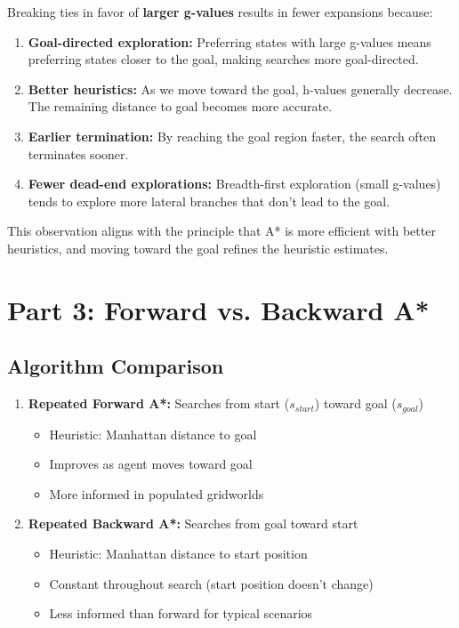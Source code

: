 \documentclass[12pt]{article}
\begin{document}
Breaking ties in favor of \textbf{larger g-values} results in fewer expansions because:

\begin{enumerate}
    \item \textbf{Goal-directed exploration:} Preferring states with large g-values means 
    preferring states closer to the goal, making searches more goal-directed.
    
    \item \textbf{Better heuristics:} As we move toward the goal, h-values generally decrease. 
    The remaining distance to goal becomes more accurate.
    
    \item \textbf{Earlier termination:} By reaching the goal region faster, the search often 
    terminates sooner.
    
    \item \textbf{Fewer dead-end explorations:} Breadth-first exploration (small g-values) 
    tends to explore more lateral branches that don't lead to the goal.
\end{enumerate}

This observation aligns with the principle that A* is more efficient with better heuristics, 
and moving toward the goal refines the heuristic estimates.


\section{Part 3: Forward vs. Backward A*}

\subsection{Algorithm Comparison}

\begin{enumerate}
    \item \textbf{Repeated Forward A*:} Searches from start ($s_{start}$) toward goal ($s_{goal}$)
    \begin{itemize}
        \item Heuristic: Manhattan distance to goal
        \item Improves as agent moves toward goal
        \item More informed in populated gridworlds
    \end{itemize}
    
    \item \textbf{Repeated Backward A*:} Searches from goal toward start
    \begin{itemize}
        \item Heuristic: Manhattan distance to start position
        \item Constant throughout search (start position doesn't change)
        \item Less informed than forward for typical scenarios
    \end{itemize}
\end{enumerate}
\end{document}
